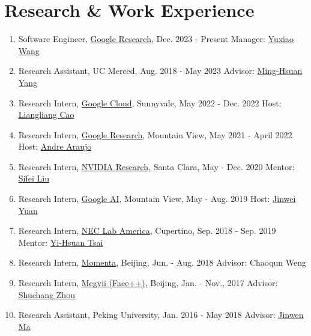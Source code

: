 \documentclass[letterpaper]{article}
\begin{document}
\section*{Research \& Work Experience}

\begin{enumerate}

\item Software Engineer, \href{https://research.google}{Google Research}, Dec. 2023 - Present \hfill Manager: \href{https://www.linkedin.com/in/yuxiaow/}{Yuxiao Wang}

\item Research Assistant, UC Merced, Aug. 2018 - May 2023 \hfill Advisor: \href{http://faculty.ucmerced.edu/mhyang/}{Ming-Hsuan Yang} 

\item Research Intern, \href{https://cloud.google.com/products/ai}{Google Cloud}, Sunnyvale, May 2022 - Dec. 2022 \hfill Host: \href{http://llcao.net/}{Liangliang Cao}  

\item Research Intern, \href{https://research.google}{Google Research}, Mountain View, May 2021 - April 2022 \hfill Host: \href{https://andrefaraujo.github.io/}{Andre Araujo} 
	
\item Research Intern, \href{https://www.nvidia.com/en-us/research/}{NVIDIA Research}, Santa Clara, May - Dec. 2020 \hfill Mentor: \href{https://www.sifeiliu.net/}{Sifei Liu}

\item Research Intern, \href{https://ai.google/}{Google AI}, Mountain View, May - Aug. 2019 \hfill Host: \href{https://scholar.google.com/citations?user=NUdlxaIAAAAJ&hl=en}{Jinwei Yuan}

\item Research Intern, \href{https://www.nec-labs.com//}{NEC Lab America}, Cupertino, Sep. 2018 - Sep. 2019 \hfill Mentor: \href{https://sites.google.com/site/yihsuantsai/}{Yi-Hsuan Tsai}  

\item Research Intern, \href{https://www.momenta.ai/en/}{Momenta}, Beijing, Jun. - Aug. 2018 \hfill Advisor: Chaoqun Weng 

\item Research Intern, \href{https://www.faceplusplus.com}{Megvii (Face++)}, Beijing, Jan. - Nov., 2017 \hfill Advisor: \href{https://zsc.github.io/}{Shuchang Zhou}

\item Research Assistant, Peking University, Jan. 2016 - May 2018 \hfill Advisor: \href{https://www.math.pku.edu.cn/teachers/jwma/homepage/}{Jinwen Ma}
	
\end{enumerate}
\end{document}
